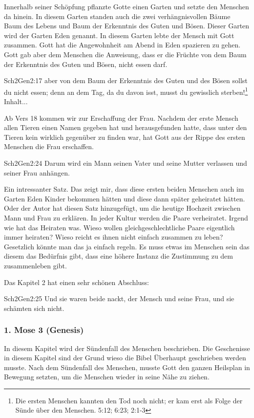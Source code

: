 Innerhalb seiner Schöpfung pflanzte Gotte einen Garten und setzte den Menschen da hinein. In diesem Garten standen auch die zwei verhängnisvollen Bäume \flqq Baum des Lebens\frqq{} und \flqq Baum der Erkenntnis des Guten und Bösen\frqq{}. Dieser Garten wird der Garten Eden genannt. In diesem Garten lebte der Mensch mit Gott zusammen. Gott hat die Angewohnheit am Abend in Eden spazieren zu gehen. Gott gab aber dem Menschen die Anweisung, dass er die Früchte von dem \flqq Baum der Erkenntnis des Guten und Bösen\flqq{}, nicht essen darf.
\begin{bibeltext}{Sch2}{Gen}{2:17}
	aber von dem Baum der Erkenntnis des Guten und des Bösen sollst du nicht essen; denn an dem Tag, da du davon isst, musst du gewisslich sterben!\footnote{Die ersten Menschen kannten den Tod noch nicht; er kam erst als Folge der Sünde über den Menschen.  {5:12};  {6:23};  {2:1-3}}
	Inhalt...
\end{bibeltext}
Ab Vers 18 kommen wir zur Erschaffung der Frau. Nachdem der erste Mensch allen Tieren einen Namen gegeben hat und herausgefunden hatte, dass unter den Tieren kein wirklich gegenüber zu finden war, hat Gott aus der Rippe des ersten Menschen die Frau erschaffen. 
\begin{bibeltext}{Sch2}{Gen}{2:24}
	Darum wird ein Mann seinen Vater und seine Mutter verlassen und seiner Frau anhängen.	
\end{bibeltext}
Ein intressanter Satz. Das zeigt mir, dass diese ersten beiden Menschen auch im Garten Eden Kinder bekommen hätten und diese dann später geheiratet hätten. Oder der Autor hat diesen Satz hinzugefügt, um die heutige Hochzeit zwischen Mann und Frau zu erklären. In jeder Kultur werden die Paare verheiratet. Irgend wie hat das Heiraten was. Wieso wollen gleichgeschlechtliche Paare eigentlich immer heiraten? Wieso reicht es ihnen nicht einfach zusammen zu leben? Gesetzlich könnte man das ja einfach regeln. Es muss etwas im Menschen sein das diesem das Bedürfnis gibt, dass eine höhere Instanz die Zustimmung zu dem zusammenleben gibt.

Das Kapitel 2 hat einen sehr schönen Abschluss:
\begin{bibeltext}{Sch2}{Gen}{2:25}
	Und sie waren beide nackt, der Mensch und seine Frau, und sie schämten sich nicht.
\end{bibeltext}
\subsubsection{1. Mose 3 (Genesis)}
In diesem Kapitel wird der Sündenfall des Menschen beschrieben. Die Geschenisse in diesem Kapitel sind der Grund wieso die Bibel Überhaupt geschrieben werden musste. Nach dem Sündenfall des Menschen, musste Gott den ganzen Heilsplan in Bewegung setzten, um die Menschen wieder in seine Nähe zu ziehen.


